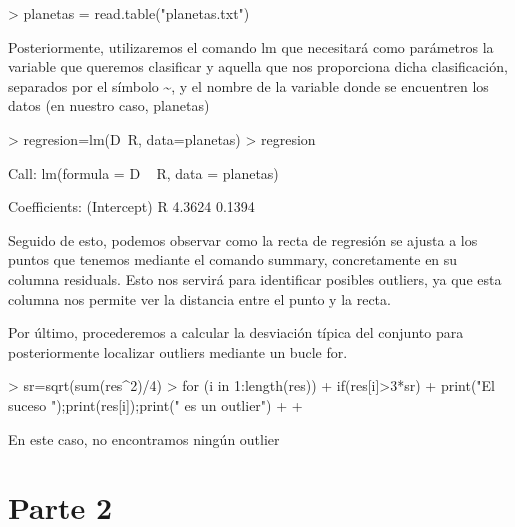 \documentclass[parskip=full]{scrartcl}
\begin{document}
\begin{Schunk}
\begin{Sinput}
> planetas = read.table("planetas.txt")
\end{Sinput}
\end{Schunk}


Posteriormente, utilizaremos el comando lm que necesitará como parámetros la variable que queremos clasificar y aquella que nos proporciona dicha clasificación, separados por el símbolo \textasciitilde{}, y el nombre de la variable donde se encuentren los datos (en nuestro caso, planetas)


\begin{Schunk}
\begin{Sinput}
> regresion=lm(D~R, data=planetas)
> regresion
\end{Sinput}
\begin{Soutput}
Call:
lm(formula = D ~ R, data = planetas)

Coefficients:
(Intercept)            R  
     4.3624       0.1394  
\end{Soutput}
\end{Schunk}


Seguido de esto, podemos observar como la recta de regresión se ajusta a los puntos que tenemos mediante el comando summary, concretamente en su columna residuals. Esto nos servirá para identificar posibles outliers, ya que esta columna nos permite ver la distancia entre el punto y la recta.


\begin{Schunk}
\end{Schunk}


Por último, procederemos a calcular la desviación típica del conjunto para posteriormente localizar outliers mediante un bucle for.


\begin{Schunk}
\begin{Sinput}
> sr=sqrt(sum(res^2)/4)
> for (i in 1:length(res)){
+   if(res[i]>3*sr){
+     print("El suceso ");print(res[i]);print(" es un outlier")
+   }
+ }
\end{Sinput}
\end{Schunk}


En este caso, no encontramos ningún outlier

\section{Parte 2}
\end{document}
